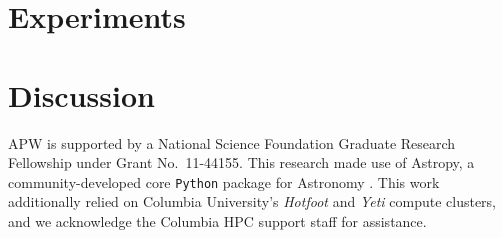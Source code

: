 \documentclass[letterpaper,12pt,preprint]{aastex}
\begin{document}
\section{Experiments}\label{sec:experiments}

\section{Discussion}\label{sec:discussion}

\acknowledgements
APW is supported by a National Science Foundation Graduate Research Fellowship under Grant No.\ 11-44155. 
This research made use of Astropy, a community-developed core \texttt{Python} package for Astronomy \citep{astropy13}.
This work additionally relied on Columbia University's \emph{Hotfoot} and \emph{Yeti} compute clusters, and we acknowledge the Columbia HPC support staff for assistance. \\



\end{document}
